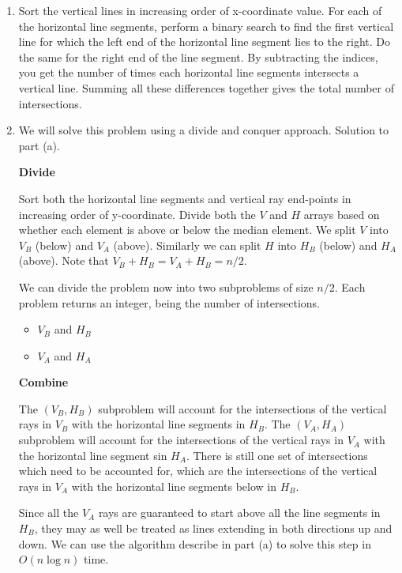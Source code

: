 \documentclass{article}
\begin{document}
\begin{solution}
\begin{enumerate}[label = (\alph*)]
    \item Sort the vertical lines in increasing order of x-coordinate value.
    For each of the horizontal line segments, perform a binary search to find the first 
    vertical line for which the left end of the horizontal line segment lies to the right.
    Do the same for the right end of the line segment.
    By subtracting the indices, you get the number of times each horizontal line segments intersects a vertical line.
    Summing all these differences together gives the total number of intersections.

    \item We will solve this problem using a divide and conquer approach. Solution to part (a).

    \textbf{Divide}

    Sort both the horizontal line segments and vertical ray end-points in increasing order of y-coordinate.
    Divide both the $V$ and $H$ arrays based on whether each element is above or below the median element.
    We split $V$ into $V_B$ (below) and $V_A$ (above). Similarly we can split $H$ into $H_B$ (below) and $H_A$ (above).
    Note that $V_B + H_B = V_A + H_B = n/2$.

    We can divide the problem now into two subproblems of size $n/2$. Each problem returns an integer, being the number of intersections.
    \begin{itemize}
        \item $V_B$ and $H_B$
        \item $V_A$ and $H_A$
    \end{itemize}

    \textbf{Combine}

    The $(V_B, H_B)$ subproblem will account for the intersections of the vertical rays in $V_B$
    with the horizontal line segments in $H_B$.
    The $(V_A, H_A)$ subproblem will account for the intersections of the vertical rays in $V_A$
    with the horizontal line segment sin $H_A$.
    There is still one set of intersections which need to be accounted for, which are the intersections 
    of the vertical rays in $V_A$ with the horizontal line segments below in $H_B$.

    Since all the $V_A$ rays are guaranteed to start above all the line segments in $H_B$, 
    they may as well be treated as lines extending in both directions up and down. 
    We can use the algorithm describe in part (a) to solve this step in $O(n\log n)$ time.


\end{enumerate}
\end{solution}
\end{document}
